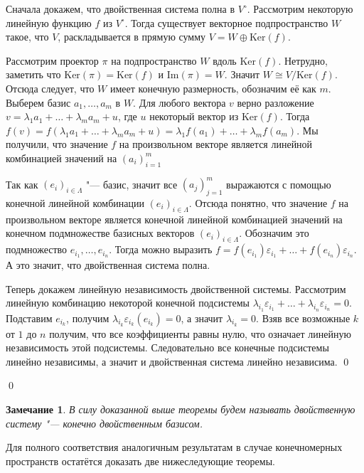 \documentclass[12pt, reqno, a4paper, oneside, notitlepage]{amsart}
\makeatletter
\theoremstyle{mytheoremstyle}
\theoremstyle{myremarkstyle}
\newtheorem{remark}[theorem]{Замечание}
\numberwithin{equation}{section}
\renewenvironment{proof}[1][\proofname]{\par\indent {\bfseries #1\@addpunct{.} }}{\qed}
\makeatother
\begin{document}
\begin{proof}
    
    Сначала докажем, что двойственная система полна в $V^\circ$. Рассмотрим некоторую линейную функцию $f$ из $V^\circ$.
    Тогда существует векторное подпространство $W$ такое, что $V$, раскладывается в прямую сумму ${V = W \oplus \mathrm{Ker} (f)}$.

    Рассмотрим проектор $\pi$ на подпространство $W$ вдоль $\mathrm{Ker}(f)$. Нетрудно, заметить что $\mathrm{Ker}(\pi) = \mathrm{Ker}(f)$ и $\mathrm{Im}(\pi) = W$. Значит $W \cong V/\mathrm{Ker}(f)$.
    Отсюда следует, что $W$ имеет конечную размерность, обозначим её как $m$. Выберем базис $a_1, \dots, a_m$ в $W$.
    Для любого вектора $v$ верно разложение $v = \lambda_1a_1+ \dots +\lambda_ma_m + u$, где $u$ некоторый вектор из $\mathrm{Ker}(f)$. Тогда $f(v) =  f(\lambda_1a_1+ \dots +\lambda_ma_m + u) = \lambda_1f(a_1)+ \dots +\lambda_mf(a_m)$. 
    Мы получили, что значение $f$ на произвольном векторе является линейной комбинацией значений на $(a_i)_{i = 1}^m$

    Так как $(e_i)_{i \in \Lambda}$ "--- базис, значит все $(a_j)_{j = 1}^m$ выражаются с помощью конечной линейной комбинации $(e_i)_{i \in \Lambda}$.
    Отсюда понятно, что значение $f$ на произвольном векторе является конечной линейной комбинацией значений на конечном подмножестве базисных векторов $(e_i)_{i \in \Lambda}$. Обозначим это подмножество $e_{i_1}, \dots, e_{i_n}$.
    Тогда можно выразить $f = f(e_{i_1})\varepsilon_{i_1} + \dots + f(e_{i_n})\varepsilon_{i_n}$.
    А это значит, что двойственная система полна.

    Теперь докажем линейную независимость двойственной системы. Рассмотрим линейную комбинацию некоторой конечной подсистемы $\lambda_{i_1}\varepsilon_{i_1} + \dots + \lambda_{i_n}\varepsilon_{i_n} = 0$. Подставим $e_{i_k}$, получим $\lambda_{i_k}\varepsilon_{i_k}(e_{i_k}) = 0$, а значит $\lambda_{i_k} = 0$. 
    Взяв все возможные $k$ от $1$ до $n$ получим, что все коэффициенты равны нулю, что означает линейную независимость этой подсистемы. Следовательно все конечные подсистемы линейно независимы, а значит и двойственная система линейно независима. \qed

\end{proof}

\begin{remark}
    В силу доказанной выше теоремы будем называть двойственную систему "--- конечно двойственным базисом.
\end{remark}
Для полного соответствия аналогичным результатам в случае конечномерных пространств остатётся доказать две нижеследующие теоремы.
\end{document}
